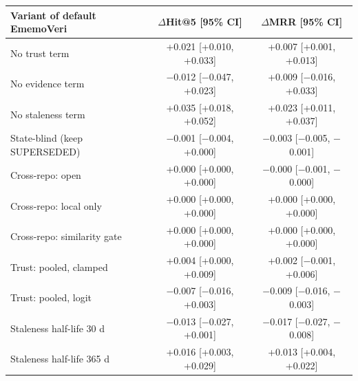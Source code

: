 \begin{tabular}{lcc}
\toprule
Variant of default EmemoVeri & $\Delta$Hit@5 [95\% CI] & $\Delta$MRR [95\% CI] \\
\midrule
No trust term & +0.021 [+0.010, +0.033] & +0.007 [+0.001, +0.013] \\
No evidence term & $-$0.012 [$-$0.047, +0.023] & +0.009 [$-$0.016, +0.033] \\
No staleness term & +0.035 [+0.018, +0.052] & +0.023 [+0.011, +0.037] \\
State-blind (keep SUPERSEDED) & $-$0.001 [$-$0.004, +0.000] & $-$0.003 [$-$0.005, $-$0.001] \\
Cross-repo: open & +0.000 [+0.000, +0.000] & $-$0.000 [$-$0.001, $-$0.000] \\
Cross-repo: local only & +0.000 [+0.000, +0.000] & +0.000 [+0.000, +0.000] \\
Cross-repo: similarity gate & +0.000 [+0.000, +0.000] & +0.000 [+0.000, +0.000] \\
Trust: pooled, clamped & +0.004 [+0.000, +0.009] & +0.002 [$-$0.001, +0.006] \\
Trust: pooled, logit & $-$0.007 [$-$0.016, +0.003] & $-$0.009 [$-$0.016, $-$0.003] \\
Staleness half-life 30 d & $-$0.013 [$-$0.027, +0.001] & $-$0.017 [$-$0.027, $-$0.008] \\
Staleness half-life 365 d & +0.016 [+0.003, +0.029] & +0.013 [+0.004, +0.022] \\
\bottomrule
\end{tabular}